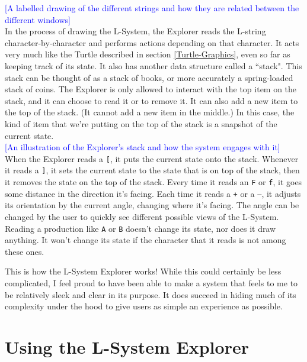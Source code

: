 \documentclass[12pt,twoside]{reedthesis}
\newcommand{\code}[1]{\texttt{#1}}
\begin{document}
	\textcolor{blue}{[A labelled drawing of the different strings and how they are related between the different windows]}\\
	
	In the process of drawing the L-System, the Explorer reads the L-string character-by-character and performs actions depending on that character. It acts very much like the Turtle described in section \ref{Turtle-Graphics}, even so far as keeping track of its state. It also has another data structure called a ``stack". This stack can be thought of as a stack of books, or more accurately a spring-loaded stack of coins. The Explorer is only allowed to interact with the top item on the stack, and it can choose to read it or to remove it. It can also add a new item to the top of the stack. (It cannot add a new item in the middle.) In this case, the kind of item that we're putting on the top of the stack is a snapshot of the current state.\\
	
	\textcolor{blue}{[An illustration of the Explorer's stack and how the system engages with it]}\\
	
	When the Explorer reads a \code{[}, it puts the current state onto the stack. Whenever it reads a \code{]}, it sets the current state to the state that is on top of the stack, then it removes the state on the top of the stack. Every time it reads an \code{F} or \code{f}, it goes some distance in the direction it's facing. Each time it reads a \code{+} or a \code{–}, it adjusts its orientation by the current angle, changing where it's facing. The angle can be changed by the user to quickly see different possible views of the L-System. Reading a production like \code{A} or \code{B} doesn't change its state, nor does it draw anything. It won't change its state if the character that it reads is not among these ones.
	
	This is how the L-System Explorer works! While this could certainly be less complicated, I feel proud to have been able to make a system that feels to me to be relatively sleek and clear in its purpose. It does succeed in hiding much of its complexity under the hood to give users as simple an experience as possible.

\section{Using the L-System Explorer}
\label{Using-the-L-System-Explorer}
\end{document}
